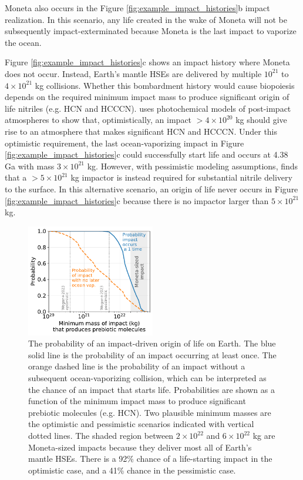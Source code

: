 \documentclass[manuscript]{aastex63}
\begin{document}
Moneta also occurs in the Figure \ref{fig:example_impact_histories}b impact realization. In this scenario, any life created in the wake of Moneta will not be subsequently impact-exterminated because Moneta is the last impact to vaporize the ocean.

Figure \ref{fig:example_impact_histories}c shows an impact history where Moneta does not occur. Instead, Earth's mantle HSEs are delivered by multiple $10^{21}$ to $4 \times 10^{21}$ kg collisions. Whether this bombardment history would cause biopoiesis depends on the required minimum impact mass to produce significant origin of life nitriles (e.g. HCN and HCCCN). \citet{Wogan_2023} uses photochemical models of post-impact atmospheres to show that, optimistically, an impact $> 4 \times 10^{20}$ kg should give rise to an atmosphere that makes significant HCN and HCCCN. Under this optimistic requirement, the last ocean-vaporizing impact in Figure \ref{fig:example_impact_histories}c could successfully start life and occurs at 4.38 Ga with mass $3 \times 10^{21}$ kg. However, with pessimistic modeling assumptions, \citet{Wogan_2023} finds that a $> 5 \times 10^{21}$ kg impactor is instead required for substantial nitrile delivery to the surface. In this alternative scenario, an origin of life never occurs in Figure \ref{fig:example_impact_histories}c because there is no impactor larger than $5 \times 10^{21}$ kg.

\begin{figure}
  \centering
  \includegraphics[width=0.5\textwidth]{figures/probabilities_of_impacts.pdf}
  \caption{The probability of an impact-driven origin of life on Earth. The blue solid line is the probability of an impact occurring at least once. The orange dashed line is the probability of an impact without a subsequent ocean-vaporizing collision, which can be interpreted as the chance of an impact that starts life. Probabilities are shown as a function of the minimum impact mass to produce significant prebiotic molecules (e.g. HCN). Two plausible minimum masses are the \citet{Wogan_2023} optimistic and pessimistic scenarios indicated with vertical dotted lines. The shaded region between $2 \times 10^{22}$ and $6 \times 10^{22}$ kg are Moneta-sized impacts because they deliver most all of Earth's mantle HSEs. There is a 92\% chance of a life-starting impact in the \citet{Wogan_2023} optimistic case, and a 41\% chance in the pessimistic case.}
  \label{fig:probabilities_of_impacts}
\end{figure}
\end{document}
